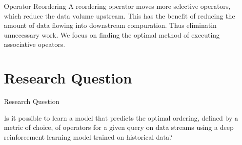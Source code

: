 \begin{frame}{Operator Reordering}
    A reordering operator moves more selective operators, which reduce the data volume upstream. This has the benefit of reducing the amount of data flowing into downstream compuration. Thus eliminatin unnecessary work. 
    We focus on finding the optimal method of executing associative opeators.
\end{frame}

\section{Research Question}
\frame{\sectionpage}

\begin{frame}{Research Question}
    \begin{center}
    Is it possible to learn a model that predicts the optimal ordering, defined by a metric of choice, of operators for a given query on data streams using a deep reinforcement learning model trained on historical data?
    \end{center}
    
\end{frame}


